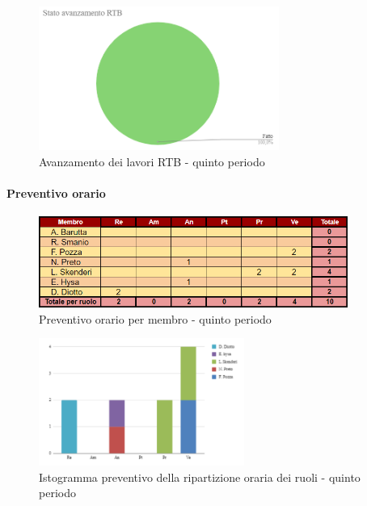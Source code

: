 \pagebreak

\begin{figure}[H]
    \centering
    \begin{minipage}[b]{0.70\textwidth}
        \centering
        \includegraphics[width=0.7\textwidth]{../Images/avanzamento5Periodo.png}
        \caption{Avanzamento dei lavori RTB - quinto periodo}
        \label{fig:Avanzamento_RTB_5}
    \end{minipage}
\end{figure}

\paragraph{Preventivo orario}

\begin{figure}[H]
    \centering
    \includegraphics[width=0.9\textwidth]{../Images/preventivoOrario5Periodo.png}
    \caption{Preventivo orario per membro - quinto periodo}
    \label{fig:Preventivo_orario_5}
\end{figure}

\vspace{0.6cm}

\begin{figure}[H] 
    \centering
    \includegraphics[width=0.6\textwidth]{../Images/preventivoDivisioneRuoli5Periodo.png}
    \caption{Istogramma preventivo della ripartizione oraria dei ruoli - quinto periodo}
    \label{fig:Preventivo_ripartizione_oraria_5}
\end{figure} 

